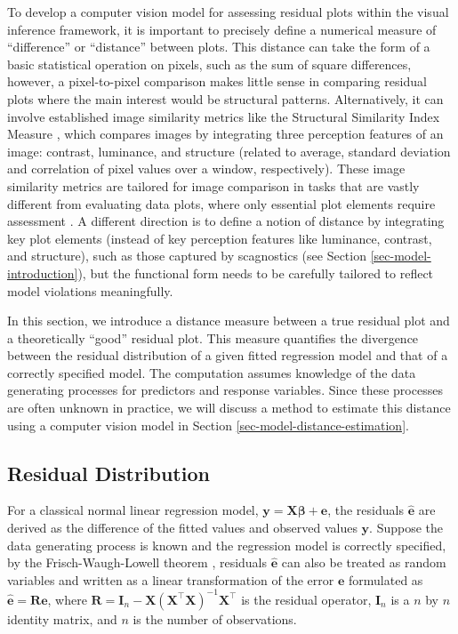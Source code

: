 \documentclass[]{interact}
\theoremstyle{plain}%
\theoremstyle{definition}
\theoremstyle{remark}
\begin{document}
To develop a computer vision model for assessing residual plots within
the visual inference framework, it is important to precisely define a
numerical measure of ``difference'' or ``distance'' between plots. This
distance can take the form of a basic statistical operation on pixels,
such as the sum of square differences, however, a pixel-to-pixel
comparison makes little sense in comparing residual plots where the main
interest would be structural patterns. Alternatively, it can involve
established image similarity metrics like the Structural Similarity
Index Measure \citep{wang2004image}, which compares images by
integrating three perception features of an image: contrast, luminance,
and structure (related to average, standard deviation and correlation of
pixel values over a window, respectively). These image similarity
metrics are tailored for image comparison in tasks that are vastly
different from evaluating data plots, where only essential plot elements
require assessment \citep{chowdhury2018measuring}. A different direction
is to define a notion of distance by integrating key plot elements
(instead of key perception features like luminance, contrast, and
structure), such as those captured by scagnostics (see Section
\ref{sec-model-introduction}), but the functional form needs to be
carefully tailored to reflect model violations meaningfully.

In this section, we introduce a distance measure between a true residual
plot and a theoretically ``good'' residual plot. This measure quantifies
the divergence between the residual distribution of a given fitted
regression model and that of a correctly specified model. The
computation assumes knowledge of the data generating processes for
predictors and response variables. Since these processes are often
unknown in practice, we will discuss a method to estimate this distance
using a computer vision model in Section
\ref{sec-model-distance-estimation}.

\subsection{Residual Distribution}\label{residual-distribution}

For a classical normal linear regression model,
\(\boldsymbol{y} = \boldsymbol{X}\boldsymbol{\beta} + \boldsymbol{e}\),
the residuals \(\hat{\boldsymbol{e}}\) are derived as the difference of
the fitted values and observed values \(\boldsymbol{y}\). Suppose the
data generating process is known and the regression model is correctly
specified, by the Frisch-Waugh-Lowell theorem \citep{frisch1933partial},
residuals \(\hat{\boldsymbol{e}}\) can also be treated as random
variables and written as a linear transformation of the error
\(\boldsymbol{e}\) formulated as
\(\hat{\boldsymbol{e}} = \boldsymbol{R}\boldsymbol{e}\), where
\(\boldsymbol{R}=\boldsymbol{I}_n -\boldsymbol{X}(\boldsymbol{X}^\top\boldsymbol{X})^{-1}\boldsymbol{X}^\top\)
is the residual operator, \(\boldsymbol{I}_n\) is a \(n\) by \(n\)
identity matrix, and \(n\) is the number of observations.
\end{document}
